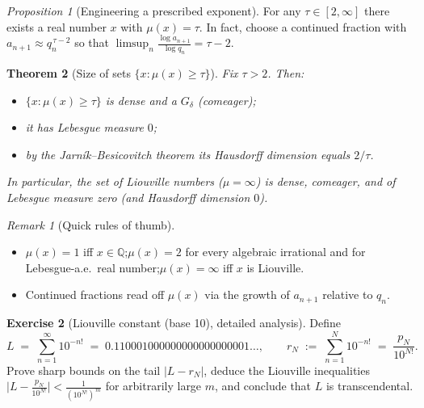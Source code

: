 \documentclass[11pt,a4paper]{article}
\newtheorem{theorem}{Theorem}
\theoremstyle{definition}
\newtheorem{exercise}{Exercise} %
\theoremstyle{definition}
\theoremstyle{plain}
\theoremstyle{remark}
\newtheorem{remark}[exercise]{Remark}
\newtheorem{proposition}[theorem]{Proposition}
\begin{document}
\begin{proposition}[Engineering a prescribed exponent]
	For any $\tau\in[2,\infty]$ there exists a real number $x$ with $\mu(x)=\tau$.
	In fact, choose a continued fraction with $a_{n+1}\approx q_n^{\,\tau-2}$ so that
	$\displaystyle \limsup_{n}\frac{\log a_{n+1}}{\log q_n}=\tau-2$.
\end{proposition}

\begin{theorem}[Size of sets $\{x:\mu(x)\ge\tau\}$]
	Fix $\tau>2$. Then:
	\begin{itemize}
		\item $\{x:\mu(x)\ge\tau\}$ is dense and a $G_\delta$ (comeager);
		\item it has Lebesgue measure $0$;
		\item by the Jarník--Besicovitch theorem its Hausdorff dimension equals $2/\tau$.
	\end{itemize}
	In particular, the set of Liouville numbers ($\mu=\infty$) is dense, comeager,
	and of Lebesgue measure zero (and Hausdorff dimension $0$).
\end{theorem}

\begin{remark}[Quick rules of thumb]
	\hfill
	\begin{itemize}
		\item $\mu(x)=1$ iff $x\in\mathbb Q$;\quad $\mu(x)=2$ for every algebraic irrational and for
		Lebesgue-a.e.\ real number;\quad $\mu(x)=\infty$ iff $x$ is Liouville.
		\item Continued fractions read off $\mu(x)$ via the growth of $a_{n+1}$ relative to $q_n$.
	\end{itemize}
\end{remark}



\begin{exercise}[Liouville constant (base 10), detailed analysis]\label{ex:Liouville-10}
	Define
	\[
	L \;=\; \sum_{n=1}^{\infty} 10^{-n!}
	\;=\; 0.110001000000000000000001\ldots,
	\qquad
	r_N \;:=\; \sum_{n=1}^{N} 10^{-n!} \;=\; \frac{p_N}{10^{N!}}.
	\]
	Prove sharp bounds on the tail $|L-r_N|$, deduce the Liouville inequalities
	\(
	\bigl|L-\frac{p_N}{10^{N!}}\bigr| < \frac{1}{(10^{N!})^{\,m}}
	\)
	for arbitrarily large $m$, and conclude that $L$ is transcendental.
\end{exercise}
\end{document}
